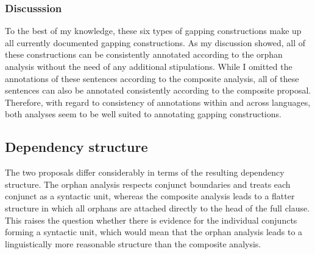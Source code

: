 \documentclass[lucida,biblatex]{sp} %
\newcounter{excounter}
\begin{document}
%  
%
%   


\subsubsection{Discusssion}

To the best of my knowledge, these six types of gapping constructions make up all currently documented gapping constructions. As my discussion showed, all of these constructions can be consistently annotated according to the {\sc orphan} analysis without the need of any additional stipulations. While I omitted the annotations of these sentences according to the {\sc composite} analysis, all of these sentences can also be annotated consistently according to the {\sc composite} proposal. Therefore, with regard to consistency of annotations within and across languages, both analyses seem to be well suited to annotating gapping constructions.

\subsection{Dependency structure}

The two proposals differ considerably in terms of the resulting dependency structure. The {\sc orphan} analysis respects conjunct boundaries and treats each conjunct as a syntactic unit, whereas the {\sc composite} analysis leads to a flatter structure in which all orphans are attached directly to the head of the full clause. This raises the question whether there is evidence for the individual conjuncts forming a syntactic unit, which would mean that the {\sc orphan} analysis leads to a linguistically more reasonable structure than the {\sc composite} analysis.
\end{document}
